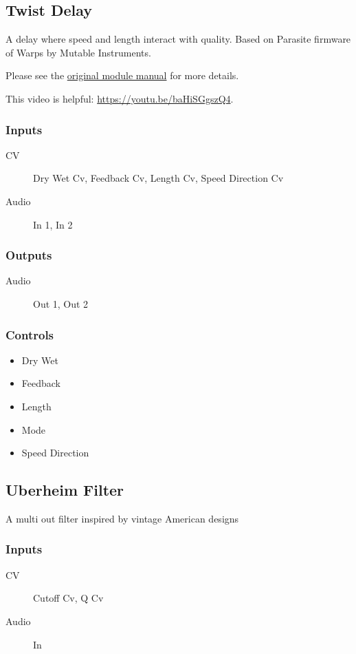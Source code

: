 \subsection{Twist Delay}

A delay where speed and length interact with quality. Based on Parasite firmware of Warps by Mutable Instruments.



Please see the \href{https://mqtthiqs.github.io/parasites/warps.html}{original module manual} for more details.

This video is helpful: \url{https://youtu.be/baHiSGgszQ4}.

\subsubsection{Inputs}
\begin{description}
\item [CV] Dry Wet Cv, Feedback Cv, Length Cv, Speed Direction Cv
\item [Audio] In 1, In 2
\end{description}

\subsubsection{Outputs}
\begin{description}
\item [Audio] Out 1, Out 2
\end{description}

\subsubsection{Controls}
\begin{itemize}
\item Dry Wet
\item Feedback
\item Length
\item Mode
\item Speed Direction
\end{itemize}

\subsection{Uberheim Filter}

A multi out filter inspired by vintage American designs



\subsubsection{Inputs}
\begin{description}
\item [CV] Cutoff Cv, Q Cv
\item [Audio] In
\end{description}

